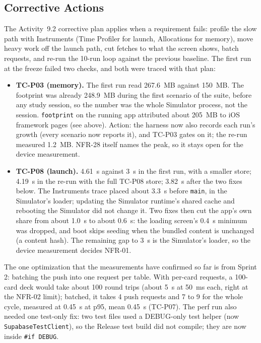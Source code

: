 \documentclass[12pt,letterpaper]{article}
\begin{document}
\subsection{Corrective Actions}
The Activity~9.2 corrective plan applies when a requirement fails: profile the slow
path with Instruments (Time Profiler for launch, Allocations for memory), move heavy
work off the launch path, cut fetches to what the screen shows, batch requests, and
re-run the 10-run loop against the previous baseline. The first run at the freeze
failed two checks, and both were traced with that plan:
\begin{itemize}
  \item \textbf{TC-P03 (memory).} The first run read 267.6~MB against 150~MB. The
        footprint was already 248.9~MB during the first scenario of the suite, before
        any study session, so the number was the whole Simulator process, not the
        session. \texttt{footprint} on the running app attributed about 205~MB to iOS
        framework pages (see above). Action: the harness now also records each run's
        growth (every scenario now reports it), and TC-P03 gates on it; the re-run
        measured 1.2~MB. NFR-28 itself names the peak, so it stays open for the
        device measurement.
  \item \textbf{TC-P08 (launch).} 4.61~s against 3~s in the first run, with a smaller
        store; 4.19~s in the re-run with the full TC-P08 store; 3.82~s after the two
        fixes below. The Instruments trace placed
        about 3.3~s before \texttt{main}, in the Simulator's loader; updating the
        Simulator runtime's shared cache and rebooting the Simulator did not change
        it. Two fixes then cut the app's own share from about 1.0~s to about 0.6~s:
        the loading screen's 0.4~s minimum was dropped, and boot skips seeding when
        the bundled content is unchanged (a content hash). The remaining gap to 3~s
        is the Simulator's loader, so the device measurement decides NFR-01.
\end{itemize}
The one optimization that the measurements have confirmed so far is from Sprint 2:
batching the push into one request per table. With per-card requests, a 100-card
deck would take about 100 round trips (about 5~s at 50~ms each, right at the NFR-02
limit); batched, it takes 4 push requests and 7 to 9 for the whole cycle, measured at
0.45~s at p95, mean 0.45~s (TC-P07). The perf run also needed one test-only fix: two test files used a DEBUG-only test
helper (now \texttt{SupabaseTestClient}), so the Release test build did not compile;
they are now inside \texttt{\#if DEBUG}.
\end{document}
